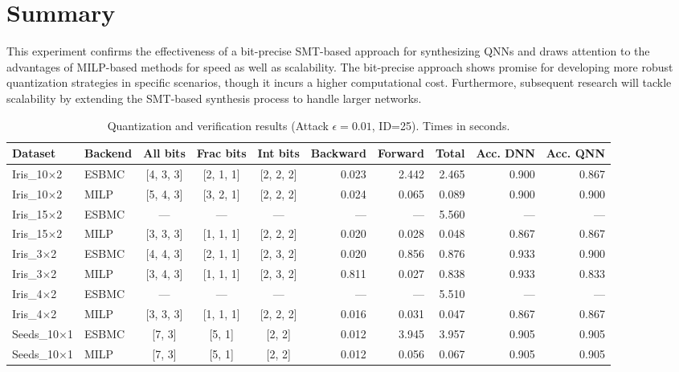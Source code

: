 \section{Summary}

This experiment confirms the effectiveness of a bit-precise SMT-based approach for synthesizing QNNs and draws attention to the advantages of MILP-based methods for speed as well as scalability. The bit-precise approach shows promise for developing more robust quantization strategies in specific scenarios, though it incurs a higher computational cost. Furthermore, subsequent research will tackle scalability by extending the SMT-based synthesis process to handle larger networks.

\begin{table}[htbp]
\centering
\caption{Quantization and verification results (Attack $\epsilon=0.01$, ID=25). Times in seconds.}
\label{tab:results-attack001-id252}
\small
\begin{tabular}{@{}llccc rrr rr@{}}
\hline
Dataset & Backend & All bits & Frac bits & Int bits & Backward & Forward & Total & Acc. DNN & Acc. QNN \\
\hline
Iris\_10$\times$2 & ESBMC & {[4, 3, 3]} & {[2, 1, 1]} & {[2, 2, 2]} & 0.023 & 2.442 & 2.465 & 0.900 & 0.867 \\
Iris\_10$\times$2 & MILP & {[5, 4, 3]} & {[3, 2, 1]} & {[2, 2, 2]} & 0.024 & 0.065 & 0.089 & 0.900 & 0.900 \\
\hline
Iris\_15$\times$2 & ESBMC & --- & --- & --- & --- & --- & 5.560 & --- & --- \\
Iris\_15$\times$2 & MILP & {[3, 3, 3]} & {[1, 1, 1]} & {[2, 2, 2]} & 0.020 & 0.028 & 0.048 & 0.867 & 0.867 \\
\hline
Iris\_3$\times$2 & ESBMC & {[4, 4, 3]} & {[2, 1, 1]} & {[2, 3, 2]} & 0.020 & 0.856 & 0.876 & 0.933 & 0.900 \\
Iris\_3$\times$2 & MILP & {[3, 4, 3]} & {[1, 1, 1]} & {[2, 3, 2]} & 0.811 & 0.027 & 0.838 & 0.933 & 0.833 \\
\hline
Iris\_4$\times$2 & ESBMC & --- & --- & --- & --- & --- & 5.510 & --- & --- \\
Iris\_4$\times$2 & MILP & {[3, 3, 3]} & {[1, 1, 1]} & {[2, 2, 2]} & 0.016 & 0.031 & 0.047 & 0.867 & 0.867 \\
\hline
Seeds\_10$\times$1 & ESBMC & {[7, 3]} & {[5, 1]} & {[2, 2]} & 0.012 & 3.945 & 3.957 & 0.905 & 0.905 \\
Seeds\_10$\times$1 & MILP & {[7, 3]} & {[5, 1]} & {[2, 2]} & 0.012 & 0.056 & 0.067 & 0.905 & 0.905 \\

\end{tabular}
\end{table}
